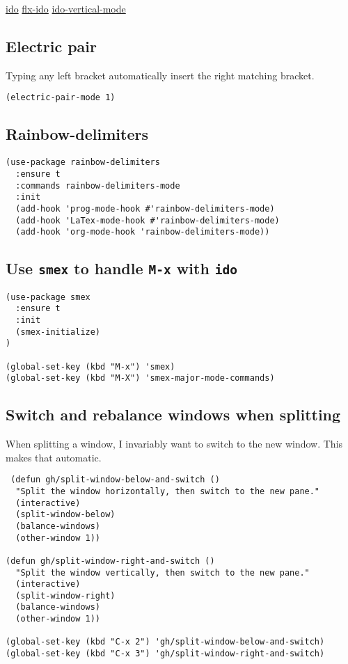 \documentclass[11pt]{article}
\begin{document}
\href{https://www.emacswiki.org/emacs/InteractivelyDoThings}{ido}
\href{https://github.com/lewang/flx}{flx-ido}
\href{https://github.com/creichert/ido-vertical-mode.el}{ido-vertical-mode}
\subsection{Electric pair}
\label{sec:orga7c8fd1}

Typing any left bracket automatically insert the right matching bracket.

\begin{verbatim}
(electric-pair-mode 1)
\end{verbatim}
\subsection{Rainbow-delimiters}
\label{sec:org7203746}

\begin{verbatim}
(use-package rainbow-delimiters
  :ensure t
  :commands rainbow-delimiters-mode
  :init
  (add-hook 'prog-mode-hook #'rainbow-delimiters-mode)
  (add-hook 'LaTex-mode-hook #'rainbow-delimiters-mode)
  (add-hook 'org-mode-hook 'rainbow-delimiters-mode))
\end{verbatim}

\subsection{Use \texttt{smex} to handle \texttt{M-x} with \texttt{ido}}
\label{sec:orgd4113d4}

\begin{verbatim}
(use-package smex
  :ensure t
  :init
  (smex-initialize)
)

(global-set-key (kbd "M-x") 'smex)
(global-set-key (kbd "M-X") 'smex-major-mode-commands)
\end{verbatim}

\subsection{Switch and rebalance windows when splitting}
\label{sec:org4e00172}

When splitting a window, I invariably want to switch to the new window. This makes that automatic.

\begin{verbatim}
 (defun gh/split-window-below-and-switch ()
  "Split the window horizontally, then switch to the new pane."
  (interactive)
  (split-window-below)
  (balance-windows)
  (other-window 1))

(defun gh/split-window-right-and-switch ()
  "Split the window vertically, then switch to the new pane."
  (interactive)
  (split-window-right)
  (balance-windows)
  (other-window 1))

(global-set-key (kbd "C-x 2") 'gh/split-window-below-and-switch)
(global-set-key (kbd "C-x 3") 'gh/split-window-right-and-switch)
\end{verbatim}
\end{document}

